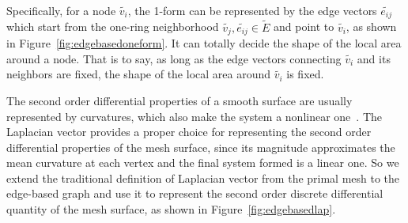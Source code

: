 Specifically, for a  node $\tilde{v_i}$, the 1-form can be
represented by the edge vectors $\tilde{e_{ij}}$ which start from
the one-ring neighborhood $\tilde{v_j},\tilde{e_{ij}}\in \tilde{E}$
and point to $\tilde{v_i}$, as shown in
Figure~\ref{fig:edgebasedoneform}. It can totally decide the shape
of the local area around a node. That is to say, as long as the edge
vectors connecting $\tilde{v_i}$ and its neighbors are fixed, the
shape of the local area around $\tilde{v_i}$ is fixed.

The second order differential properties of  a smooth surface are
usually represented by curvatures, which also make the system a
nonlinear one~\cite{ESP08}. The Laplacian vector provides a proper
choice for representing the second order differential properties of
the mesh surface, since its magnitude approximates the mean
curvature at each vertex and the final system formed is a linear
one. So we extend the traditional definition of Laplacian vector
from the primal mesh to the edge-based graph and use it to represent
the second order discrete differential quantity of the mesh surface,
as shown in Figure~\ref{fig:edgebasedlap}.

